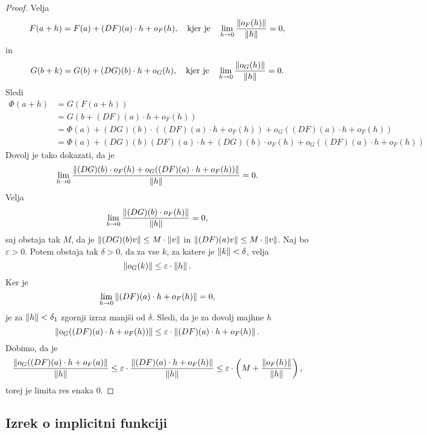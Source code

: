 \begin{proof}
Velja
\[
F(a+h) = F(a) + (DF)(a) \cdot h + o_F(h),
\quad \text{kjer je} \quad
\lim_{h \to 0}\frac{\left\lVert o_F(h)\right\rVert}{\left\lVert h\right\rVert} = 0,
\]
in
\[
G(b+k) = G(b) + (DG)(b) \cdot h + o_G(h),
\quad \text{kjer je} \quad
\lim_{h \to 0}\frac{\left\lVert o_G(h)\right\rVert}{\left\lVert h\right\rVert} = 0.
\]
Sledi
\begin{align*}
\Phi(a+h) &= G(F(a+h))
\\
&= G(b + (DF)(a) \cdot h + o_F(h))
\\
&= \Phi(a) + (DG)(b) \cdot ((DF)(a) \cdot h +
o_F(h)) + o_G((DF)(a) \cdot h + o_F(h))
\\
&= \Phi(a) + (DG)(b)(DF)(a) \cdot h +
(DG)(b) \cdot o_F(h) + o_G((DF)(a) \cdot h + o_F(h))
\end{align*}
Dovolj je tako dokazati, da je
\[
\lim_{h \to 0}\frac{
\left\lVert (DG)(b) \cdot o_F(h) + o_G((DF)(a) \cdot h + o_F(h))\right\rVert
}{\left\lVert h\right\rVert} = 0.
\]
Velja
\[
\lim_{h \to 0}\frac{\left\lVert (DG)(b) \cdot o_F(h)\right\rVert}{\left\lVert h\right\rVert} = 0,
\]
saj obstaja tak $M$, da je
$\left\lVert (DG)(b) v\right\rVert \leq M \cdot \left\lVert v\right\rVert$ in
$\left\lVert (DF)(a) v\right\rVert \leq M \cdot \left\lVert v\right\rVert$.
Naj bo $\varepsilon > 0$. Potem obstaja tak $\delta > 0$, da za vse
$k$, za katere je $\left\lVert k\right\rVert < \delta$, velja
\[
\left\lVert o_G(k)\right\rVert \leq \varepsilon \cdot \left\lVert h\right\rVert.
\]
Ker je
\[
\lim_{h \to 0} \left\lVert (DF)(a) \cdot h + o_F(h)\right\rVert = 0,
\]
je za $\left\lVert h\right\rVert < \delta_1$ zgornji izraz manjši od $\delta$.
Sledi, da je za dovolj majhne $h$
\[
\left\lVert o_G((DF)(a) \cdot h + o_F(h))\right\rVert \leq
\varepsilon \cdot \left\lVert (DF)(a) \cdot h + o_F(h)\right\rVert.
\]
Dobimo, da je
\[
\frac{\left\lVert o_G((DF)(a) \cdot h + o_F(a)\right\rVert}{\left\lVert h\right\rVert} \leq
\varepsilon \cdot
\frac{\left\lVert (DF)(a) \cdot h + o_F(h)\right\rVert}{\left\lVert h\right\rVert} \leq
\varepsilon \cdot \left(M + \frac{\left\lVert o_F(h)\right\rVert}{\left\lVert h\right\rVert}\right),
\]
torej je limita res enaka $0$.
\end{proof}

\newpage

\subsection{Izrek o implicitni funkciji}

